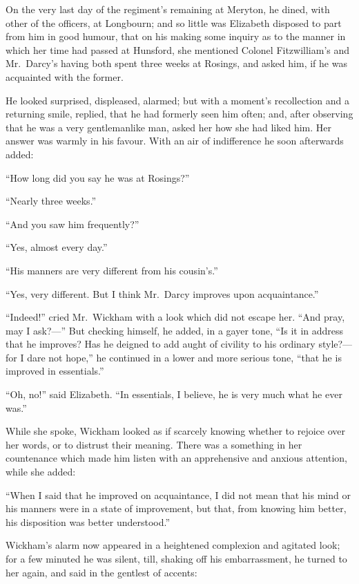 On the very last day of the regiment's remaining at Meryton, he
dined, with other of the officers, at Longbourn; and so little
was Elizabeth disposed to part from him in good humour, that on
his making some inquiry as to the manner in which her time had
passed at Hunsford, she mentioned Colonel Fitzwilliam's and
Mr.\ Darcy's having both spent three weeks at Rosings, and
asked him, if he was acquainted with the former.

He looked surprised, displeased, alarmed; but with a moment's
recollection and a returning smile, replied, that he had formerly
seen him often; and, after observing that he was a very
gentlemanlike man, asked her how she had liked him.  Her
answer was warmly in his favour.  With an air of indifference he
soon afterwards added:

``How long did you say he was at Rosings?''

``Nearly three weeks.''

``And you saw him frequently?''

``Yes, almost every day.''

``His manners are very different from his cousin's.''

``Yes, very different.  But I think Mr.\ Darcy improves upon
acquaintance.''

``Indeed!'' cried Mr.\ Wickham with a look which did not escape
her.  ``And pray, may I ask?---''  But checking himself, he added,
in a gayer tone, ``Is it in address that he improves?  Has he
deigned to add aught of civility to his ordinary style?---for I
dare not hope,'' he continued in a lower and more serious tone,
``that he is improved in essentials.''

``Oh, no!'' said Elizabeth.  ``In essentials, I believe, he is very
much what he ever was.''

While she spoke, Wickham looked as if scarcely knowing
whether to rejoice over her words, or to distrust their meaning.
There was a something in her countenance which made him listen
with an apprehensive and anxious attention, while she added:

``When I said that he improved on acquaintance, I did not mean
that his mind or his manners were in a state of improvement, but
that, from knowing him better, his disposition was better
understood.''

Wickham's alarm now appeared in a heightened complexion and
agitated look; for a few minuted he was silent, till, shaking
off his embarrassment, he turned to her again, and said in the
gentlest of accents:

